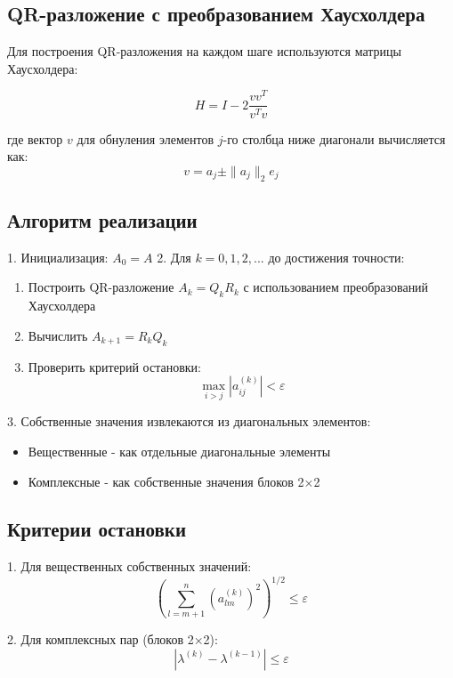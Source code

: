 \subsection{QR-разложение с преобразованием Хаусхолдера}
Для построения QR-разложения на каждом шаге используются матрицы Хаусхолдера:

\begin{equation}
H = I - 2\frac{vv^T}{v^Tv}
\end{equation}

где вектор $v$ для обнуления элементов $j$-го столбца ниже диагонали вычисляется как:
\begin{equation}
v = a_j \pm \|a_j\|_2 e_j
\end{equation}

\subsection*{Алгоритм реализации}
1. Инициализация: $A_0 = A$
2. Для $k = 0,1,2,...$ до достижения точности:
   \begin{enumerate}
   \item Построить QR-разложение $A_k = Q_k R_k$ с использованием преобразований Хаусхолдера
   \item Вычислить $A_{k+1} = R_k Q_k$
   \item Проверить критерий остановки:
   \begin{equation}
   \max_{i>j} |a_{ij}^{(k)}| < \varepsilon
   \end{equation}
   \end{enumerate}
3. Собственные значения извлекаются из диагональных элементов:
\begin{itemize}
\item Вещественные - как отдельные диагональные элементы
\item Комплексные - как собственные значения блоков 2×2
\end{itemize}

\subsection*{Критерии остановки}
1. Для вещественных собственных значений:
\begin{equation}
\left( \sum_{l=m+1}^n (a_{lm}^{(k)})^2 \right)^{1/2} \leq \varepsilon
\end{equation}

2. Для комплексных пар (блоков 2×2):
\begin{equation}
|\lambda^{(k)} - \lambda^{(k-1)}| \leq \varepsilon
\end{equation}

